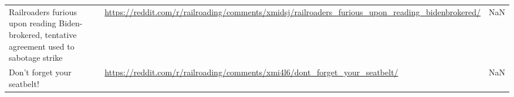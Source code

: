 \documentclass{article}%
\begin{document}
\begin{table}[htbp]
\begin{adjustbox}{width=1\textwidth}
\begin{tabular}{lll}
                                                                                                                                                                                                             Railroaders furious upon reading Biden-brokered, tentative agreement used to sabotage strike &       \href{https://reddit.com/r/railroading/comments/xmidsj/railroaders_furious_upon_reading_bidenbrokered/}{https://reddit.com/r/railroading/comments/xmidsj/railroaders_furious_upon_reading_bidenbrokered/} &           NaN \\
                                                                                                                                                                                                                                                                              Don’t forget your seatbelt! &                                                 \href{https://reddit.com/r/railroading/comments/xmi4l6/dont_forget_your_seatbelt/}{https://reddit.com/r/railroading/comments/xmi4l6/dont_forget_your_seatbelt/} &           NaN \\
\bottomrule
\end{tabular}
%
\end{adjustbox}%
\end{table}

%
\end{document}
